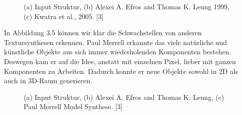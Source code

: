 \documentclass[12pt, a4paper,twoside,openright]{report}
\begin{document}
\begin{figure}[H]
    \centering
    \qquad
    \qquad
    \caption{(a) Input Struktur, (b) Alexei A. Efros and Thomas K. Leung 1999, (c) Kwatra et al., 2005. [3]}%
\end{figure}

In Abbildung 3.5 können wir klar die Schwachstellen von anderen Textursynthesen erkennen.
\newline
Paul Merrell erkannte das viele natürliche und künstliche Objekte aus sich immer wiederholenden Komponenten bestehen.
Deswegen kam er auf die Idee, anstatt mit einzelnen Pixel, lieber mit ganzen Komponenten zu Arbeiten.
Dadurch konnte er neue Objekte sowohl in 2D als auch in 3D-Raum generieren.

\begin{figure}[H]
    \centering
    \qquad
    \qquad
    \caption{(a) Input Struktur, (b) Alexei A. Efros and Thomas K. Leung, (c) Paul Merrell Model Synthese. [3]}%
\end{figure}
\end{document}
